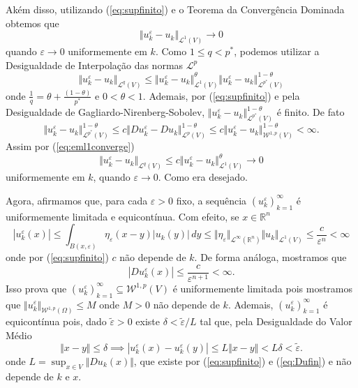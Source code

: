 \documentclass[a4paper, 11pt]{book}
\theoremstyle{definition}
\newcommand{\bR}{\mathbb{R}}
\newcommand{\cL}{\mathcal{L}}
\newcommand{\cW}{\mathcal{W}}
\begin{document}
\begin{prf}
\[    \]
    Akém disso, utilizando (\ref{eq:supfinito}) e o Teorema da Convergência Dominada obtemos que
    \begin{equation} \label{eq:eml1converge}
        \Vert u_k^\varepsilon - u_k \Vert_{\cL^1(V)} \to 0
    \end{equation}
    quando $\varepsilon \to 0$ uniformemente em $k$. Como $1 \leqslant q < p^*$, podemos utilizar a Desigualdade de Interpolação das normas $\cL^p$
    \[
        \Vert u_k^\varepsilon - u_k \Vert_{\cL^q(V)} \leqslant \Vert u_k^\varepsilon - u_k \Vert_{\cL^1(V)}^\theta \Vert u_k^\varepsilon - u_k \Vert_{\cL^{p^*}(V)}^{1- \theta}
    \]
    onde $\frac{1}{q} = \theta + \frac{(1 - \theta)}{p^*}$ e $0 < \theta < 1$.
    Ademais, por (\ref{eq:supfinito}) e pela Desigualdade de Gagliardo-Nirenberg-Sobolev, $\Vert u_k^\varepsilon - u_k \Vert_{\cL^{p^*}(V)}^{1- \theta}$ é finito. De fato
    \[
        \Vert u_k^\varepsilon - u_k \Vert_{\cL^{p^*}(V)}^{1 - \theta} \leqslant c \Vert Du_k^\varepsilon - Du_k \Vert_{\cL^p(V)}^{1 - \theta} \leqslant c \Vert u_k^\varepsilon - u_k \Vert_{\cW^{1,p}(V)}^{1- \theta} < \infty. 
    \]
    Assim por (\ref{eq:eml1converge})
    \[
        \Vert u_k^\varepsilon - u_k \Vert_{\cL^q(V)} \leqslant c \Vert u_k^\varepsilon - u_k \Vert_{\cL^1(V)}^\theta \to 0
    \]
    uniformemente em $k$, quando $\varepsilon \to 0$. Como era desejado.

    Agora, afirmamos que, para cada $\varepsilon > 0$ fixo, a sequência $(u_k^\varepsilon)_{k=1}^\infty$ é uniformemente limitada e equicontínua.
    Com efeito, se $x \in \bR^n$
    \begin{equation} \label{eq:ufin}
        |u_k^\varepsilon(x)| \leqslant \int_{B(x,\varepsilon)} \eta_\varepsilon (x - y) |u_k(y)| \,dy \leqslant \Vert \eta_\varepsilon \Vert_{\cL^\infty(\bR^n)} \Vert u_k \Vert_{\cL^1(V)} \leqslant \frac{c}{\varepsilon^n} < \infty
    \end{equation}
    onde por (\ref{eq:supfinito}) $c$ não depende de $k$. De forma análoga, mostramos que
    \begin{equation} \label{eq:Dufin}
        |Du_k^\varepsilon(x)|  \leqslant \frac{c}{\varepsilon^{n+1}} < \infty.
    \end{equation}
    Isso prova que $(u_k^\varepsilon)_{k=1}^\infty \subseteq \cW^{1,p}(V)$ é uniformemente limitada pois mostramos que $\Vert u_k^\varepsilon \Vert_{\cW^{1,p}(\Omega)}\leqslant M$ onde $M > 0$ não depende de $k$.
    Ademais, $(u_k^\varepsilon)_{k=1}^\infty$ é equicontínua pois, dado $\tilde\varepsilon > 0$ existe $\delta < \tilde\varepsilon / L$ tal que, pela Desigualdade do Valor Médio
    \[
        \Vert x - y \Vert \leqslant \delta \implies |u_k^\varepsilon(x) - u_k^\varepsilon(y)| \leqslant L \Vert x - y \Vert < L \delta < \tilde\varepsilon.
    \]
    onde $L = \sup_{x \in V} \Vert Du_k(x) \Vert$, que existe por (\ref{eq:supfinito}) e (\ref{eq:Dufin}) e não depende de $k$ e $x$.


\end{prf}
\end{document}
